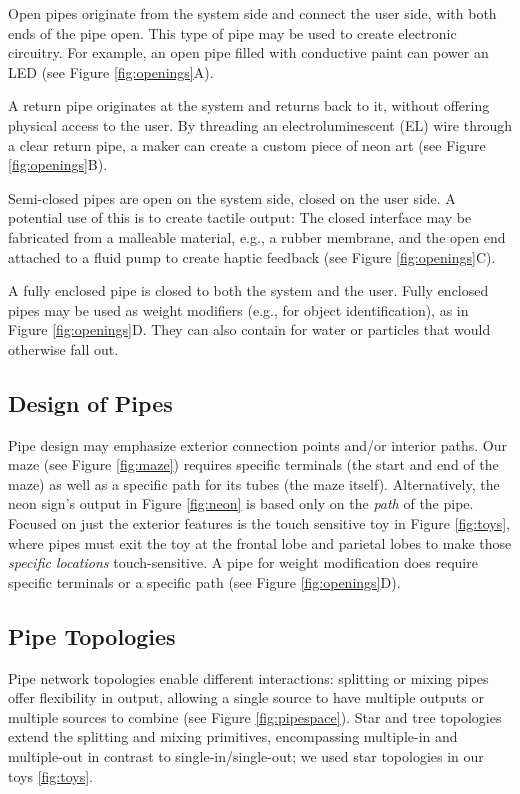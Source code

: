 Open pipes originate from the system side and connect the user side, with both ends of the pipe open. This type of pipe may be used to create electronic circuitry.  For example, an open pipe filled with conductive paint can power an LED (see Figure \ref{fig:openings}A).

A return pipe originates at the system and returns back to it, without offering physical access to the user.  By threading an electroluminescent (EL) wire through a clear return pipe, a maker can create a custom piece of neon art (see Figure \ref{fig:openings}B). 

Semi-closed pipes are open on the system side, closed on the user side. A potential use of this is to create tactile output: The closed interface may be fabricated from a malleable material, e.g., a rubber membrane, and the open end attached to a fluid pump to create haptic feedback (see Figure \ref{fig:openings}C).

A fully enclosed pipe is closed to both the system and the user.  Fully enclosed pipes may be used as weight modifiers (e.g., for object identification), as in Figure \ref{fig:openings}D.  They can also contain for water or particles that would otherwise fall out.

\subsection{Design of Pipes}
Pipe design may emphasize exterior connection points and/or interior paths.  Our maze (see Figure \ref{fig:maze}) requires specific terminals (the start and end of the maze) as well as a specific path for its tubes (the maze itself).  Alternatively, the neon sign's output in Figure \ref{fig:neon} is based only on the \emph{path} of the pipe.  Focused on just the exterior features is the touch sensitive toy in Figure \ref{fig:toys}, where pipes must exit the toy at the frontal lobe and parietal lobes to make those \emph{specific locations} touch-sensitive.  A pipe for weight modification does require specific terminals or a specific path (see Figure \ref{fig:openings}D).

\subsection{Pipe Topologies}

Pipe network topologies enable different interactions: splitting or mixing pipes offer flexibility in output, allowing a single source to have multiple outputs or multiple sources to combine (see Figure \ref{fig:pipespace}).  Star and tree topologies extend the splitting and mixing primitives, encompassing multiple-in and multiple-out in contrast to single-in/single-out; we used star topologies in our toys \ref{fig:toys}.

